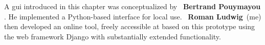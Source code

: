 \begin{tcolorbox}[
    title=\faIcon{users} Contributions,
    parbox=false,
    float
]
    A \acrlong{gui} introduced in this chapter was conceptualized by ~\textbf{Bertrand Pouymayou} \cite{pouymayou_analysis_2019}. He implemented a Python-based interface for local use. ~\textbf{Roman Ludwig}~(me) then developed an online tool, freely accessible at  based on this prototype using the web framework Django \cite{noauthor_django_2022} with substantially extended functionality.
\end{tcolorbox}
